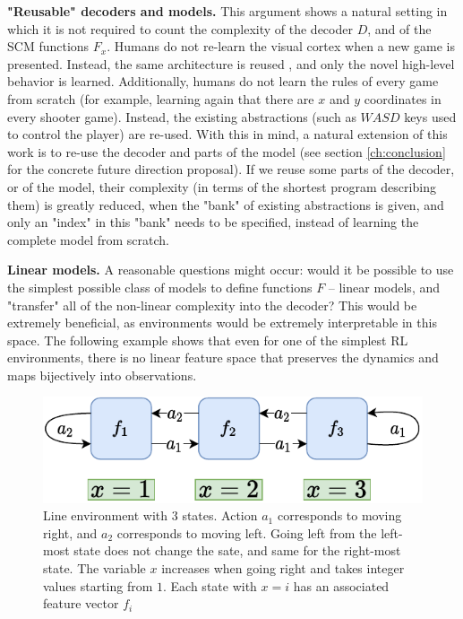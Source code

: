 \documentclass[a4paper,11pt,oneside]{report}
\begin{document}
{\bf "Reusable" decoders and models.} This argument shows a natural setting in which it is not required to count the complexity of the decoder $D$, and of the SCM functions $F_x$. Humans do not re-learn the visual cortex when a new game is presented. Instead, the same architecture is reused \cite{Bengio2012}, and only the novel high-level behavior is learned. Additionally, humans do not learn the rules of every game from scratch (for example, learning again that there are $x$ and $y$ coordinates in every shooter game). Instead, the existing abstractions (such as $WASD$ keys used to control the player) are re-used. With this in mind, a natural extension of this work is to re-use the decoder and parts of the model (see section \ref{ch:conclusion} for the concrete future direction proposal). If we reuse some parts of the decoder, or of the model, their complexity (in terms of the shortest program describing them) is greatly reduced, when the "bank" of existing abstractions is given, and only an "index" in this "bank" needs to be specified, instead of learning the complete model from scratch.


{\bf Linear models.} A reasonable questions might occur: would it be possible to use the simplest possible class of models to define functions $F$ -- linear models, and "transfer" all of the non-linear complexity into the decoder? This would be extremely beneficial, as environments would be extremely interpretable in this space. The following example shows that even for one of the simplest RL environments, there is no linear feature space that preserves the dynamics and maps bijectively into observations.

\begin{figure}
    \centering
    \includegraphics[width=0.7\linewidth]{diagrams/env_line_3}
    \caption{Line environment with 3 states. Action $a_1$ corresponds to moving right, and $a_2$ corresponds to moving left. Going left from the left-most state does not change the sate, and same for the right-most state. The variable $x$ increases when going right and takes integer values starting from $1$. Each state with $x=i$ has an associated feature vector $f_i$}
    \label{fig:env_line3}
\end{figure}
\end{document}
